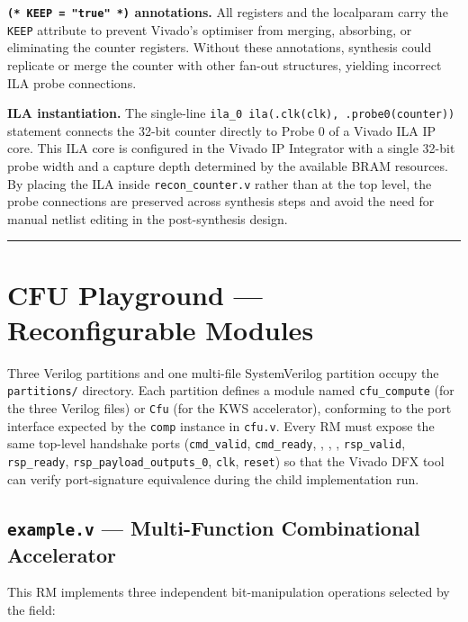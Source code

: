 \textbf{\texttt{(* KEEP = "true" *)} annotations.} All registers and the localparam carry the \texttt{KEEP} attribute to prevent Vivado's optimiser from merging, absorbing, or eliminating the counter registers. Without these annotations, synthesis could replicate or merge the counter with other fan-out structures, yielding incorrect ILA probe connections.

\textbf{ILA instantiation.} The single-line \texttt{ila\_0 ila(.clk(clk), .probe0(counter))} statement connects the 32-bit counter directly to Probe 0 of a Vivado ILA IP core. This ILA core is configured in the Vivado IP Integrator with a single 32-bit probe width and a capture depth determined by the available BRAM resources. By placing the ILA inside \texttt{recon\_counter.v} rather than at the top level, the probe connections are preserved across synthesis steps and avoid the need for manual netlist editing in the post-synthesis design.

\vspace{0.4em}\hrule\vspace{0.4em}

\section{CFU Playground — Reconfigurable Modules}

Three Verilog partitions and one multi-file SystemVerilog partition occupy the \texttt{partitions/} directory. Each partition defines a module named \texttt{cfu\_compute} (for the three Verilog files) or \texttt{Cfu} (for the KWS accelerator), conforming to the port interface expected by the \texttt{comp} instance in \texttt{cfu.v}. Every RM must expose the same top-level handshake ports (\texttt{cmd\_valid}, \texttt{cmd\_ready}, , , , \texttt{rsp\_valid}, \texttt{rsp\_ready}, \texttt{rsp\_payload\_outputs\_0}, \texttt{clk}, \texttt{reset}) so that the Vivado DFX tool can verify port-signature equivalence during the child implementation run.

\subsection{\texttt{example.v} — Multi-Function Combinational Accelerator}

This RM implements three independent bit-manipulation operations selected by the  field:

